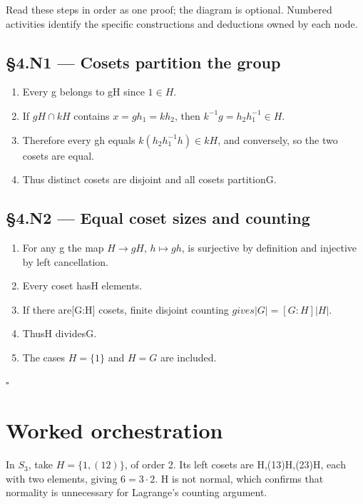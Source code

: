 \documentclass[preprint,12pt,aps,pra,showkeys,amsmath,amssymb,superscriptaddress,floatfix]{revtex4-2}
\theoremstyle{definition}
\theoremstyle{remark}
\begin{document}
Read these steps in order as one proof; the diagram is optional.
Numbered activities identify the specific constructions and deductions
owned by each node.

\subsection{§4.N1 --- Cosets partition the
group}\label{n1-cosets-partition-the-group}

\begin{enumerate}
\def\labelenumi{\arabic{enumi}.}
\item
  Every g belongs to gH since \(1\in H\).
\item
  If \(gH\cap kH\) contains \(x=gh_{1}=kh_{2}\), then
  \(k^{-1}g=h_{2}h_{1}^{-1}\in H\).
\item
  Therefore every gh equals \(k(h_{2}h_{1}^{-1}h)\in kH\), and
  conversely, so the two cosets are equal.
\item
  Thus distinct cosets are disjoint and all cosets partitionG.
\end{enumerate}

\subsection{§4.N2 --- Equal coset sizes and
counting}\label{n2-equal-coset-sizes-and-counting}

\begin{enumerate}
\def\labelenumi{\arabic{enumi}.}
\item
  For any g the map \(H\to gH\), \(h\mapsto gh\), is surjective by
  definition and injective by left cancellation.
\item
  Every coset has\textbar H\textbar{} elements.
\item
  If there are{[}G:H{]} cosets, finite disjoint counting
  \(gives|G|=[G:H]|H|\).
\item
  Thus\textbar H\textbar{} divides\textbar G\textbar.
\item
  The cases \(H=\{1\}\) and \(H=G\) are included.
\end{enumerate}

\hfill$\square$

\section{Worked orchestration}

In \(S_{3}\), take \(H=\{1,(12)\}\), of order 2. Its left cosets are
H,(13)H,(23)H, each with two elements, giving \(6=3\cdot 2\). H is not
normal, which confirms that normality is unnecessary for Lagrange's
counting argument.
\end{document}
